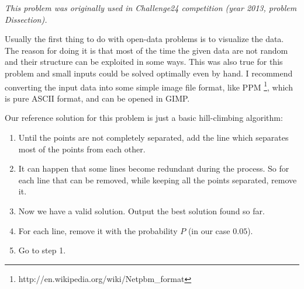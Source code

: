 


\textit{This problem was originally used in Challenge24 competition (year 2013, problem Dissection).}

Usually the first thing to do with open-data problems is to visualize the data.
The reason for doing it is that most of the time the given data are not random
and their structure can be exploited in some ways. This was also true for this
problem and small inputs could be solved optimally even by hand.
I recommend converting the input data into some simple image file format,
like PPM \footnote{http://en.wikipedia.org/wiki/Netpbm\_format}, which is pure
ASCII format, and can be opened in GIMP.

Our reference solution for this problem is just a basic hill-climbing algorithm:
\begin{enumerate}
\item Until the points are not completely separated, add the line which separates most
of the points from each other.
\item It can happen that some lines become redundant during the process. So for each
line that can be removed, while keeping all the points separated, remove it.
\item Now we have a valid solution. Output the best solution found so far.
\item For each line, remove it with the probability $P$ (in our case $0.05$).
\item Go to step 1.
\end{enumerate}
